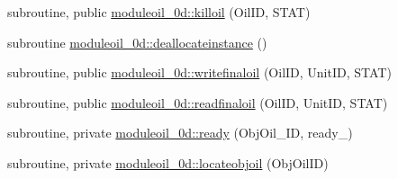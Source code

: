 \begin{DoxyCompactItemize}
\item 
subroutine, public \mbox{\hyperlink{namespacemoduleoil__0d_af1fa454b03e05f0047dd0b211f889b4b}{moduleoil\+\_\+0d\+::killoil}} (Oil\+ID, S\+T\+AT)
\item 
subroutine \mbox{\hyperlink{namespacemoduleoil__0d_af21b7b35e50b7197438d5bfc61cb5ac4}{moduleoil\+\_\+0d\+::deallocateinstance}} ()
\item 
subroutine, public \mbox{\hyperlink{namespacemoduleoil__0d_ac8ffff6a84b585607cbd75e554459582}{moduleoil\+\_\+0d\+::writefinaloil}} (Oil\+ID, Unit\+ID, S\+T\+AT)
\item 
subroutine, public \mbox{\hyperlink{namespacemoduleoil__0d_aa7833f46fb80b6ff52234957c56b77d2}{moduleoil\+\_\+0d\+::readfinaloil}} (Oil\+ID, Unit\+ID, S\+T\+AT)
\item 
subroutine, private \mbox{\hyperlink{namespacemoduleoil__0d_a5cfb3f6c158c2f89ed12f50f11b66786}{moduleoil\+\_\+0d\+::ready}} (Obj\+Oil\+\_\+\+ID, ready\+\_\+)
\item 
subroutine, private \mbox{\hyperlink{namespacemoduleoil__0d_a9c7229be13ce2cc83e0f461b6355f4fa}{moduleoil\+\_\+0d\+::locateobjoil}} (Obj\+Oil\+ID)
\end{DoxyCompactItemize}
